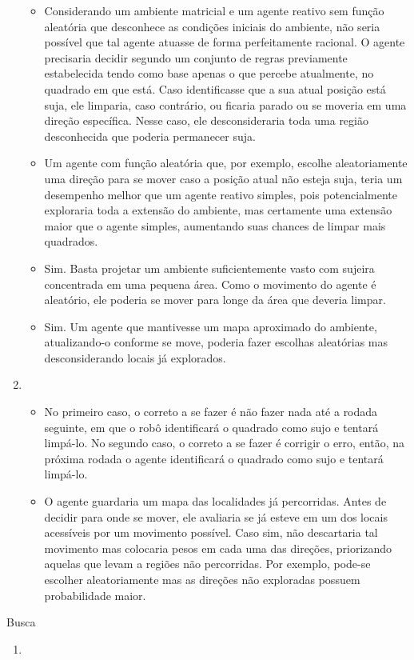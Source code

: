 \documentclass{article}
\begin{document}
\begin{enumerate}
		\begin{itemize}
			\item Considerando um ambiente matricial e um agente reativo sem função aleatória que desconhece as condições iniciais do ambiente, não seria possível que tal agente atuasse de forma perfeitamente racional. O agente precisaria decidir segundo um conjunto de regras previamente estabelecida tendo como base apenas o que percebe atualmente, no quadrado em que está. Caso identificasse que a sua atual posição está suja, ele limparia, caso contrário, ou ficaria parado ou se moveria em uma direção específica. Nesse caso, ele desconsideraria toda uma região desconhecida que poderia permanecer suja.
			\item Um agente com função aleatória que, por exemplo, escolhe aleatoriamente uma direção para se mover caso a posição atual não esteja suja, teria um desempenho melhor que um agente reativo simples, pois potencialmente exploraria toda a extensão do ambiente, mas certamente uma extensão maior que o agente simples, aumentando suas chances de limpar mais quadrados.
			\item Sim. Basta projetar um ambiente suficientemente vasto com sujeira concentrada em uma pequena área. Como o movimento do agente é aleatório, ele poderia se mover para longe da área que deveria limpar.
			\item Sim. Um agente que mantivesse um mapa aproximado do ambiente, atualizando-o conforme se move, poderia fazer escolhas aleatórias mas desconsiderando locais já explorados.
		\end{itemize}
	\item 

		\begin{itemize}
			\item No primeiro caso, o correto a se fazer é não fazer nada até a rodada seguinte, em que o robô identificará o quadrado como sujo e tentará limpá-lo. No segundo caso, o correto a se fazer é corrigir o erro, então, na próxima rodada o agente identificará o quadrado como sujo e tentará limpá-lo.
			\item O agente guardaria um mapa das localidades já percorridas. Antes de decidir para onde se mover, ele avaliaria se já esteve em um dos locais acessíveis por um movimento possível. Caso sim, não descartaria tal movimento mas colocaria pesos em cada uma das direções, priorizando aquelas que levam a regiões não percorridas. Por exemplo, pode-se escolher aleatoriamente mas as direções não exploradas possuem probabilidade maior.
		\end{itemize}
\end{enumerate}

Busca

\begin{enumerate}
	\item 
\end{enumerate}
\end{document}
